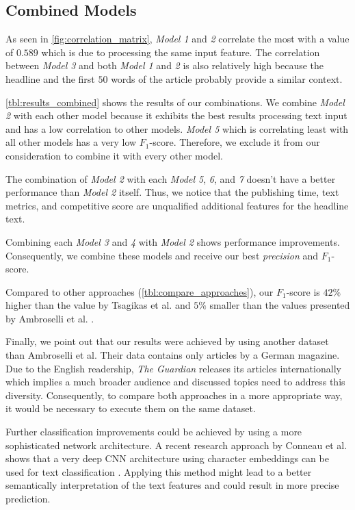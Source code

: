 \subsection{Combined Models}
As seen in \autoref{fig:correlation_matrix}, \textit{Model 1} and \textit{2} correlate the most with a value of $0.589$ which is due to processing the same input feature.
The correlation between \textit{Model 3} and both \textit{Model 1} and \textit{2} is also relatively high because the headline and the first $50$ words of the article probably provide a similar context.

\autoref{tbl:results_combined} shows the results of our combinations. We combine \textit{Model 2} with each other model because it exhibits the best results processing text input and has a low correlation to other models.
\textit{Model 5} which is correlating least with all other models has a very low $F_1$-score. Therefore, we exclude it from our consideration to combine it with every other model.



The combination of \textit{Model 2} with each \textit{Model 5}, \textit{6}, and \textit{7} doesn't have a better performance than \textit{Model 2} itself. 
Thus, we notice that the publishing time, text metrics, and competitive score are unqualified additional features for the headline text.

Combining each \textit{Model 3} and \textit{4} with \textit{Model 2} shows performance improvements.
Consequently, we combine these models and receive our best \textit{precision} and $F_1$-score.

Compared to other approaches (\autoref{tbl:compare_approaches}), our $F_1$-score is $42\%$ higher than the  value by Tsagikas et al. and $5\%$ smaller than the values presented by Ambroselli et al. \cite{ambroselli2018prediction}.



Finally, we point out that our results were achieved by using another dataset than Ambroselli et al. 
Their data contains only articles by a German magazine. 
Due to the English readership, \textit{The Guardian} releases its articles internationally which implies a much broader audience and discussed topics need to address this diversity. Consequently, to compare both approaches in a more appropriate way, it would be necessary to execute them on the same dataset.

Further classification improvements could be achieved by using a more sophisticated network architecture. A recent research approach by Conneau et al. shows that a very deep CNN architecture using character embeddings can be used for text classification \cite{conneau2016very}. Applying this method might lead to a better semantically interpretation of the text features and could result in more precise prediction.